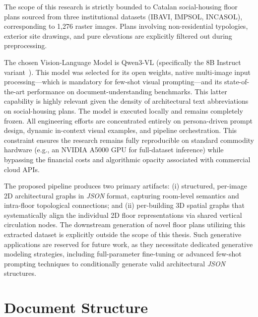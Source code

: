 \documentclass[12pt,a4paper,openright]{report}
\begin{document}
The scope of this research is strictly bounded to Catalan social-housing floor plans sourced from three institutional datasets (IBAVI, IMPSOL, INCASOL), corresponding to 1,276 raster images. Plans involving non-residential typologies, exterior site drawings, and pure elevations are explicitly filtered out during preprocessing.

The chosen Vision-Language Model is Qwen3-VL (specifically the 8B Instruct variant~\cite{qwen3technicalreport}). This model was selected for its open weights, native multi-image input processing---which is mandatory for few-shot visual prompting---and its state-of-the-art performance on document-understanding benchmarks. This latter capability is highly relevant given the density of architectural text abbreviations on social-housing plans. The model is executed locally and remains completely frozen. All engineering efforts are concentrated entirely on persona-driven prompt design, dynamic in-context visual examples, and pipeline orchestration. This constraint ensures the research remains fully reproducible on standard commodity hardware (e.g., an NVIDIA A5000 GPU for full-dataset inference) while bypassing the financial costs and algorithmic opacity associated with commercial cloud APIs.

The proposed pipeline produces two primary artifacts: (i) structured, per-image 2D architectural graphs in \textit{JSON} format, capturing room-level semantics and intra-floor topological connections; and (ii) per-building 3D spatial graphs that systematically align the individual 2D floor representations via shared vertical circulation nodes. The downstream generation of novel floor plans utilizing this extracted dataset is explicitly outside the scope of this thesis. Such generative applications are reserved for future work, as they necessitate dedicated generative modeling strategies, including full-parameter fine-tuning or advanced few-shot prompting techniques to conditionally generate valid architectural \textit{JSON} structures.

\section{Document Structure}
\end{document}
